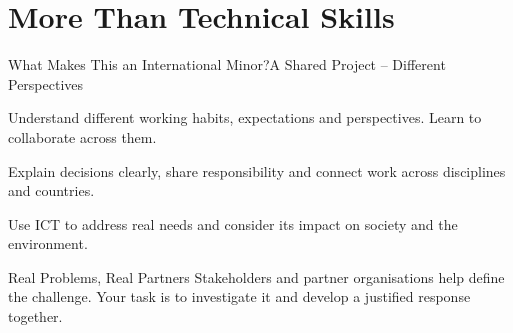 \part[nopartpage]{More Than Technical Skills}

\begin{frame}{What Makes This an International Minor?}{A Shared Project -- Different Perspectives}
\begin{description}
\item[Intercultural Awareness] Understand different working habits, expectations and perspectives. Learn to collaborate across them.
\item[International Teamwork] Explain decisions clearly, share responsibility and connect work across disciplines and countries.
\item[Global Responsibility] Use ICT to address real needs and consider its impact on society and the environment.
\end{description}
\begin{block}{Real Problems, Real Partners}
Stakeholders and partner organisations help define the challenge. Your task is to investigate it and develop a justified response together.
\end{block}
\end{frame}
